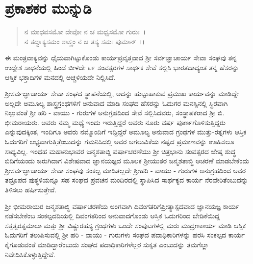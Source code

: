 
\chapter*{ಪ್ರಕಾಶಕರ ಮುನ್ನುಡಿ}

\begin{verse}
ನ ಮಾಧವಸಮೋ ದೇವೋ ನ ಚ ಮಧ್ವಸಮೋ ಗುರುಃ~।\\ ನ ತದ್ವಾಕ್ಯಸಮಂ ಶಾಸ್ತ್ರಂ ನ ಚ ತಸ್ಯ ಸಮಃ ಪುಮಾನ್~।।
\end{verse}

ಈ ಮಂತ್ರವಾಕ್ಯವನ್ನು ಧೈಯವಾಗಿಟ್ಟುಕೊಂಡು ಕಾರ್ಯಪ್ರವೃತ್ತವಾದ ಶ‍್ರೀ ಸರ್ವಜ್ಞಾ\-ಚಾರ್ಯ ಸೇವಾ ಸಂಘವು ತನ್ನ ಉದ್ದೇಶ ಸಾಧನೆಯಲ್ಲಿ ಹಿಂದೆ ಬೀಳದೇ ೬೯ ಸಂವತ್ಸರಗಳ ಸಾರ್ಥಕ ಸೇವೆ ಸಲ್ಲಿಸಿ ಭಾರತದಾದ್ಯಂತ ತನ್ನ ಹೆಸರನ್ನು ಆಸ್ತಿಕ ಭಕ್ತಾದಿಗಳ ಮನದಲ್ಲಿ ಅಚ್ಚಳಿಯದೇ ನಿಲ್ಲಿಸಿದೆ.

ಶ‍್ರೀಸರ್ವಜ್ಞಾಚಾರ್ಯ ಸೇವಾ ಸಂಘದ ಸ್ಥಾಪನೆಯಲ್ಲಿ, ಅದನ್ನು ಹುಟ್ಟುಹಾಕುವ ಪ್ರಮುಖ ಕಾರ್ಯವನ್ನು ಮಾಡಿದ್ದೇ ಅಲ್ಲದೇ ಅಮೂಲ್ಯ ಶಾಸ್ತ್ರಗ್ರಂಥಗಳಿಗೆ ಅನುವಾದ ಮಾಡಿ ಸಂಘದ ಹೆಸರನ್ನು ಓದುಗರ ಮನಸ್ಸಿನಲ್ಲಿ ಸ್ಥಿರವಾಗಿ ನಿಲ್ಲುವಂತೆ ಶ‍್ರೀ ಹರಿ - ವಾಯು - ಗುರು\-ಗಳ ಅನುಗ್ರಹದಿಂದ ಸೇವೆ ಸಲ್ಲಿಸಿದವರು, ಸಂಸ್ಥಾಪಕರಾದ ಶ‍್ರೀ ಬಿ. ಭೀಮರಾಯರು. ಅವರು ನಮ್ಮ ಮಧ್ಯೆ ಇಂದು ಇರುತ್ತಿದ್ದರೆ ಅವರು ನೂರು ವರ್ಷ ಪೂರ್ಣಗೊಳಿಸುತ್ತಿದ್ದರು ಎನ್ನುವುದಕ್ಕಿಂತ, ಇಂದಿಗೂ ಅವರು ನಮ್ಮೊಂದಿಗೆ ಇದ್ದಿದ್ದರೆ ಅಮೂಲ್ಯ ಅನುವಾದ ಗ್ರಂಥಗಳ ಮುತ್ತು-ರತ್ನಗಳು ಆಸ್ತಿಕ ಓದುಗರಿಗೆ ಲಭ್ಯವಾಗುತ್ತಿತ್ತೆಂಬುದನ್ನು ಗಮನಿಸಿದಲ್ಲಿ ಅವರ ಅಗಲುವಿಕೆಯ ನಷ್ಟದ ಪ್ರಮಾಣವನ್ನು ಊಹಿಸಲೂ ಸಾಧ್ಯವಿಲ್ಲ. ಇಂಥಹ ಮಹಾನುಭಾವರ ಜನ್ಮಶತಾಬ್ದಿ ವರ್ಷಾಚರಣೆಯು ಶ‍್ರೀ ಚಿತ್ರಭಾನು ಸಂವತ್ಸರದ ಜೇಷ್ಠ ಶುದ್ಧ ಬಿದಿಗೆಯಂದು ಜರುಗಿದಾಗ ವಿಶೇಷವಾದ ಜ್ಞಾನಯಜ್ಞದ ಮೂಲಕ ಶ‍್ರೀಯುತರ ಜನ್ಮಶತಾಬ್ಧಿ ಆಚರಣೆ ಮಾಡಬೇಕೆಂದು ಶ‍್ರೀಸರ್ವಜ್ಞಾಚಾರ್ಯ ಸೇವಾ ಸಂಘವು ಸಂಕಲ್ಪ ಮಾಡಿತಲ್ಲದೇ ಶ‍್ರೀಹರಿ - ವಾಯು - ಗುರುಗಳ ಅನುಗ್ರಹದಿಂದ ಅವರ ತದ್ರೂಪದ ಪುತ್ಥಳಿಯನ್ನೂ ಸಹ ಸಂಘದ ಪ್ರವಚನ ಮಂದಿರದಲ್ಲಿ ಸ್ಥಾಪಿಸಿದ ಸಾರ್ಥಕ್ಯದ ಕಾರ್ಯ ನೆರವೇರಿತೆಂಬುದನ್ನು ತಿಳಿಸಲು ಹರ್ಷಿಸುತ್ತೇವೆ.

\newpage

ಶ‍್ರೀ ಭೀಮರಾಯರ ಜನ್ಮಶತಾಬ್ಧಿ ವರ್ಷಾಚರಣೆಯ ಅಂಗವಾಗಿ ದಿವಂಗತರಿಗೆ\break ಪ್ರೀತ್ಯಾಸ್ಪದವಾದ ಜ್ಞಾನಯಜ್ಞ ಕಾರ್ಯ ನಡೆಸಬೇಕೆಂಬ ಸಂಕಲ್ಪದಡಿಯಲ್ಲಿ ದಿವಂಗತರಿಂದ ಅನುವಾದಗೊಂಡು ಆಸ್ತಿಕ ಓದುಗರಿಂದ ಬೇಡಿಕೆಯಿದ್ದ ಸತ್ತತ್ವರತ್ನಮಾಲಾ ಮತ್ತು ಶ‍್ರೀ ವಿಷ್ಣುರಹಸ್ಯ ಗ್ರಂಥಗಳು ಒಂದೇ ಸಂಪುಟಗಳಲ್ಲಿ ಮರು ಮುದ್ರಣಕಾರ್ಯ ಮಾಡಿ ಆಸ್ತಿಕ ಓದುಗರಿಗೆ ತಲುಪಿಸುವಲ್ಲಿ ಶ‍್ರೀ ಹರಿ - ವಾಯು - ಗುರುಗಳು ಸಂಘದ ಪದಾಧಿಕಾರಿಗಳನ್ನು ಹರಸಿ ಸಂಕಲ್ಪದ ಕಾರ್ಯ ಕೈಗೂಡುವಂತೆ ಮಾಡಿದ್ದಾರೆಂಬುದು ಸಂಘದ ಪದಾಧಿಕಾರಿಗಳೆಲ್ಲರ ಸುಕೃತ ಎಂಬುದನ್ನು ತಮಗೆಲ್ಲಾ ನಿವೇದಿಸಿಕೊಳ್ಳುತ್ತಿದ್ದೇವೆ.

